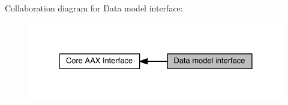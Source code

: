 Collaboration diagram for Data model interface\+:
\nopagebreak
\begin{figure}[H]
\begin{center}
\leavevmode
\includegraphics[width=328pt]{a00328}
\end{center}
\end{figure}
